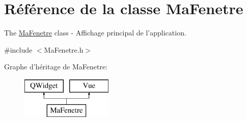 \hypertarget{class_ma_fenetre}{\section{Référence de la classe Ma\-Fenetre}
\label{class_ma_fenetre}
}


The \hyperlink{class_ma_fenetre}{Ma\-Fenetre} class -\/ Affichage principal de l'application.  




{\ttfamily \#include $<$Ma\-Fenetre.\-h$>$}

Graphe d'héritage de Ma\-Fenetre\-:\begin{figure}[H]
\begin{center}
\leavevmode
\includegraphics[height=2.000000cm]{class_ma_fenetre}
\end{center}
\end{figure}
